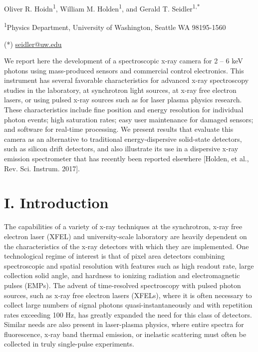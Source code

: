 {\centering
Oliver R. Hoidn\textsuperscript{1}, William M.
Holden\textsuperscript{1}, and Gerald T. Seidler\textsuperscript{1,*}

\bigbreak

\textsuperscript{1}Physics Department, University of Washington, Seattle
WA 98195-1560

}

(*) \href{mailto:Seidler@uw.edu}{seidler@uw.edu}

\begin{addmargin}[4em]{1em}
We report here the development of a spectroscopic x-ray camera for 2 --
6 keV photons using mass-produced sensors and commercial control
electronics. This instrument has several favorable characteristics for
advanced x-ray spectroscopy studies in the laboratory, at synchrotron
light sources, at x-ray free electron lasers, or using pulsed x-ray
sources such as for laser plasma physics research. These characteristics
include fine position and energy resolution for individual photon
events; high saturation rates; easy user maintenance for damaged
sensors; and software for real-time processing. We present results that
evaluate this camera as an alternative to traditional energy-dispersive
solid-state detectors, such as silicon drift detectors, and also
illustrate its use in a dispersive x-ray emission spectrometer that has
recently been reported elsewhere {[}Holden, et al., Rev. Sci. Instrum.
2017{]}.
\end{addmargin}

\section{I. Introduction}
The capabilities of a variety of x-ray techniques at the synchrotron,
x-ray free electron laser (XFEL) and university-scale laboratory are
heavily dependent on the characteristics of the x-ray detectors with
which they are implemented. One technological regime of interest is that
of pixel area detectors combining spectroscopic and spatial resolution
with features such as high readout rate, large collection solid angle,
and hardness to ionizing radiation and electromagnetic pulses (EMPs).
The advent of time-resolved spectroscopy with pulsed photon sources,
such as x-ray free electron lasers (XFELs), where it is often necessary
to collect large numbers of signal photons quasi-instantaneously and
with repetition rates exceeding 100 Hz, has greatly expanded the need
for this class of detectors. Similar needs are also present in
laser-plasma physics, where entire spectra for fluorescence, x-ray band
thermal emission, or inelastic scattering must often be collected in
truly single-pulse experiments.

